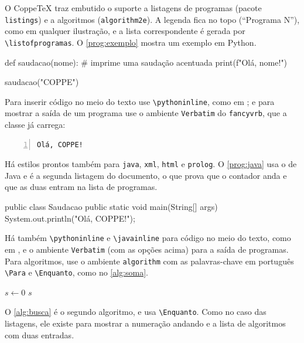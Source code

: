 \documentclass[dsc,pdfa]{coppe}
\begin{document}
O CoppeTeX traz embutido o suporte a listagens de programas (pacote \verb|listings|) e a algoritmos (\verb|algorithm2e|). A legenda fica no topo (``Programa N''), como em qualquer ilustração, e a lista correspondente é gerada por \verb|\listofprogramas|. O \autoref{prog:exemplo} mostra um exemplo em Python.

\begin{python}[caption={Exemplo de programa em Python},label=prog:exemplo]
def saudacao(nome):
    # imprime uma saudação acentuada
    print(f"Olá, {nome}!")

saudacao("COPPE")
\end{python}

Para inserir código no meio do texto use \verb|\pythoninline|, como em ; e para mostrar a saída de um programa use o ambiente \verb|Verbatim| do \texttt{fancyvrb}, que a classe já carrega:

\begin{Verbatim}[frame=lines,numbers=left,numbersep=0.5em]
Olá, COPPE!
\end{Verbatim}

Há estilos prontos também para \verb|java|, \verb|xml|, \verb|html| e \verb|prolog|. O \autoref{prog:java} usa o de Java e é a segunda listagem do documento, o que prova que o contador anda e que as duas entram na lista de programas.

\begin{java}[caption={Exemplo de programa em Java},label=prog:java]
public class Saudacao {
    public static void main(String[] args) {
        System.out.println("Olá, COPPE!");
    }
}
\end{java}

Há também \verb|\pythoninline| e \verb|\javainline| para código no meio do
texto, como em , e o ambiente \verb|Verbatim| (com as opções acima) para a saída de programas. Para algoritmos, use o ambiente \verb|algorithm| com as palavras-chave em português \verb|\Para| e \verb|\Enquanto|, como no \autoref{alg:soma}.

\begin{algorithm}[H]
\caption{Soma dos elementos de um vetor}
\label{alg:soma}
$s \leftarrow 0$\;
\Retorna $s$\;
\end{algorithm}

O \autoref{alg:busca} é o segundo algoritmo, e usa \verb|\Enquanto|. Como no caso das listagens, ele existe para mostrar a numeração andando e a lista de algoritmos com duas entradas.
\end{document}
